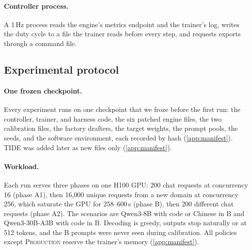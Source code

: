 \documentclass{article}
\newcommand{\pol}[1]{\textsc{#1}}
\begin{document}
\paragraph{Controller process.} A 1\,Hz process reads the engine's metrics endpoint and the trainer's log, writes the duty cycle to a file the trainer reads before every step, and requests exports through a command file.

\subsection{Experimental protocol}\label{sec:setup}

\paragraph{One frozen checkpoint.} Every experiment runs on one checkpoint that we froze before the first run: the controller, trainer, and harness code, the six patched engine files, the two calibration files, the factory drafters, the target weights, the prompt pools, the seeds, and the software environment, each recorded by hash (\cref{app:manifest}). \pol{TIDE} was added later as new files only (\cref{app:manifest}).

\paragraph{Workload.} Each run serves three phases on one H100 GPU: 200 chat requests at concurrency 16 (phase A1), then 16{,}000 unique requests from a new domain at concurrency 256, which saturate the GPU for 258--600\,s (phase B), then 200 different chat requests (phase A2). The scenarios are Qwen3-8B with code or Chinese in B and Qwen3-30B-A3B with code in B. Decoding is greedy, outputs stop naturally or at 512 tokens, and the B prompts were never seen during calibration. All policies except \pol{Production} reserve the trainer's memory (\cref{app:manifest}).
\end{document}
